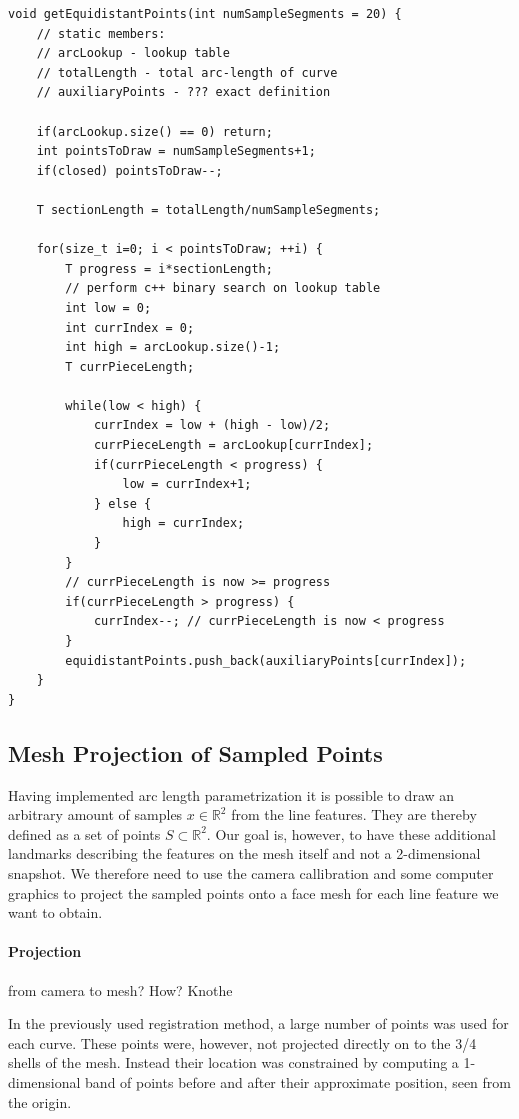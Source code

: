 \begin{lstlisting}[label=some-code, caption=Equidistant Sampling]
void getEquidistantPoints(int numSampleSegments = 20) {
    // static members: 
    // arcLookup - lookup table
    // totalLength - total arc-length of curve
    // auxiliaryPoints - ??? exact definition 

    if(arcLookup.size() == 0) return;
    int pointsToDraw = numSampleSegments+1; 
    if(closed) pointsToDraw--;

    T sectionLength = totalLength/numSampleSegments;

    for(size_t i=0; i < pointsToDraw; ++i) {
        T progress = i*sectionLength;
        // perform c++ binary search on lookup table
        int low = 0;
        int currIndex = 0;
        int high = arcLookup.size()-1;
        T currPieceLength; 

        while(low < high) {
            currIndex = low + (high - low)/2; 
            currPieceLength = arcLookup[currIndex];
            if(currPieceLength < progress) {
                low = currIndex+1;
            } else {
                high = currIndex;
            }
        }
        // currPieceLength is now >= progress
        if(currPieceLength > progress) {
            currIndex--; // currPieceLength is now < progress
        }
        equidistantPoints.push_back(auxiliaryPoints[currIndex]);   
    }
}
\end{lstlisting}

\subsection{Mesh Projection of Sampled Points}
Having implemented arc length parametrization it is possible to draw an arbitrary amount of samples $x \in \mathbb{R}^2$ from the line features. They are thereby defined as a set of points $S \subset \mathbb{R}^2$. Our goal is, however, to have these additional landmarks describing the features on the mesh itself and not a 2-dimensional snapshot.
We therefore need to use the camera callibration and some computer graphics to project the sampled points onto a face mesh for each line feature we want to obtain.

\paragraph{Projection}
from camera to mesh? How? Knothe

In the previously used registration method, a large number of points was used for each curve. These points were, however, not projected directly on to the 3/4 shells of the mesh. Instead their location was constrained by computing a 1-dimensional band of points before and after their approximate position, seen from the origin.

